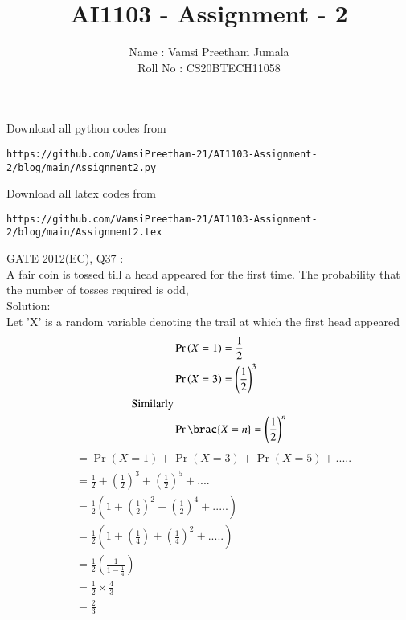 \documentclass[journal,12pt,twocolumn]{IEEEtran}
\title{AI1103 - Assignment - 2}
\author{Name : Vamsi Preetham Jumala \\Roll No : CS20BTECH11058}
\begin{document}
\maketitle
Download all python codes from
\begin{lstlisting}
https://github.com/VamsiPreetham-21/AI1103-Assignment-2/blog/main/Assignment2.py
\end{lstlisting}
Download all latex codes from
\begin{lstlisting}
https://github.com/VamsiPreetham-21/AI1103-Assignment-2/blog/main/Assignment2.tex
\end{lstlisting}
GATE 2012(EC), Q37 :\\
A fair coin is tossed till a head appeared for the first time. The probability that the number of tosses required is odd,\\
Solution:\\
Let 'X' is a random variable denoting the trail at which the first head appeared\\
\begin{align}
    &\Pr\left(X=1\right)=\frac{1}{2}\\
    &\Pr\left(X=3\right)=\left(\frac{1}{2}\right)^3\\
    \text{Similarly}\\
    &\Pr\brac{X=n}=\left(\frac{1}{2}\right)^n
\end{align}
\begin{align}
    &=\Pr\left(X=1\right)+\Pr\left(X=3\right)+\Pr\left(X=5\right)+.....\\
    &=\frac{1}{2}+\left(\frac{1}{2}\right)^3+\left(\frac{1}{2}\right)^5+....\\
    &=\frac{1}{2}\left(1+\left(\frac{1}{2}\right)^2+\left(\frac{1}{2}\right)^4+.....\right)\\
    &=\frac{1}{2}\left(1+\left(\frac{1}{4}\right)+\left(\frac{1}{4}\right)^2+.....\right)\\
    &=\frac{1}{2}\left(\frac{1}{1-\frac{1}{4}}\right)\\
    &=\frac{1}{2}\times\frac{4}{3}\\
    &=\frac{2}{3}
\end{align}
\end{document}
